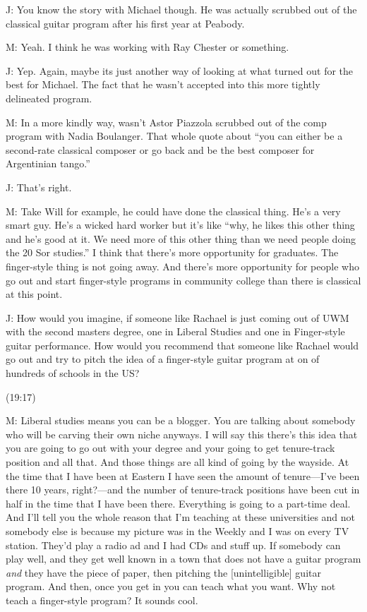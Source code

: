 \documentclass[11pt]{article}
\begin{document}
J: You know the story with Michael though. He was actually scrubbed out of the classical guitar program after his first year at Peabody. 

M: Yeah. I think he was working with Ray Chester or something. 

J: Yep. Again, maybe its just another way of looking at what turned out for the best for Michael. The fact that he wasn't accepted into this more tightly delineated program.

M: In a more kindly way, wasn't Astor Piazzola scrubbed out of the comp program with Nadia Boulanger. That whole quote about ``you can either be a second-rate classical composer or go back and be the best composer for Argentinian tango.''

J: That's right. 

M: Take Will for example, he could have done the classical thing. He's a very smart guy. He's a wicked hard worker but it's like ``why, he likes this other thing and he's good at it. We need more of this other thing than we need people doing the 20 Sor studies.'' I think that there's more opportunity for graduates. The finger-style thing is not going away. And there's more opportunity for people who go out and start finger-style programs in community college than there is classical at this point. 

J: How would you imagine, if someone like Rachael is just coming out of UWM with the second masters degree, one in Liberal Studies and one in Finger-style guitar performance. How would you recommend that someone like Rachael would go out and try to pitch the idea of a finger-style guitar program at on of hundreds of schools in the US?

(19:17)

M: Liberal studies means you can be a blogger. You are talking about somebody who will be carving their own niche anyways. I will say this there's this idea that you are going to go out with your degree and your going to get tenure-track position and all that. And those things are all kind of going by the wayside. At the time that I have been at Eastern I have seen the amount of tenure—I've been there 10 years, right?—and the number of tenure-track positions have been cut in half in the time that I have been there. Everything is going to a part-time deal. And I'll tell you the whole reason that I'm teaching at these universities and not somebody else is because my picture was in the Weekly and I was on every TV station. They'd play a radio ad and I had CDs and stuff up. If somebody can play well, and they get well known in a town that does not have a guitar program \emph{and} they have the piece of paper, then pitching the [unintelligible] guitar program. And then, once you get in you can teach what you want. Why not teach a finger-style program? It sounds cool. 
\end{document}
